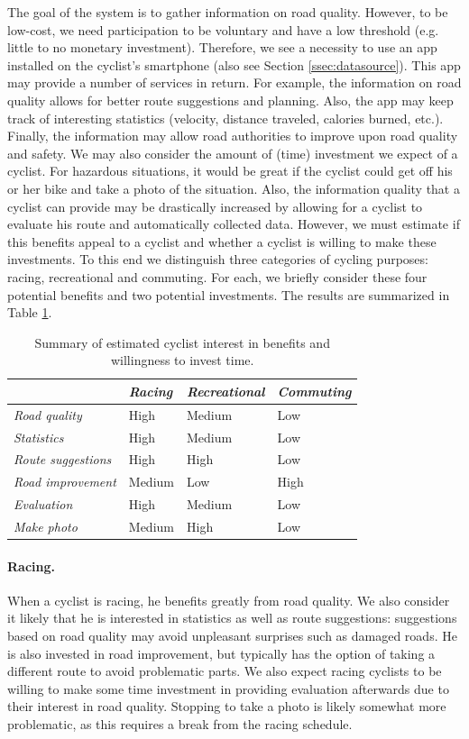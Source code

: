 \documentclass[a4paper,11pt]{article}
\begin{document}
The goal of the system is to gather information on road quality. However, to be low-cost, we need participation to be voluntary and have a low threshold (e.g. little to no monetary investment). Therefore, we see a necessity to use an app installed on the cyclist's smartphone (also see Section \ref{ssec:datasource}). This app may provide a number of services in return. For example, the information on road quality allows for better route suggestions and planning. Also, the app may keep track of interesting statistics (velocity, distance traveled, calories burned, etc.). Finally, the information may allow road authorities to improve upon road quality and safety.
We may also consider the amount of (time) investment we expect of a cyclist. For hazardous situations, it would be great if the cyclist could get off his or her bike and take a photo of the situation. Also, the information quality that a cyclist can provide may be drastically increased by allowing for a cyclist to evaluate his route and automatically collected data.
However, we must estimate if this benefits appeal to a cyclist and whether a cyclist is willing to make these investments. To this end we distinguish three categories of cycling purposes: racing, recreational and commuting. For each, we briefly consider these four potential benefits and two potential investments. The results are summarized in Table \ref{tab:incentives}.

\begin{table}[b]
\centering
\begin{tabular}{l | l l l}
 & \emph{Racing} & \emph{Recreational} & \emph{Commuting}\\
\hline
\emph{Road quality} & High & Medium & Low \\
\emph{Statistics} & High & Medium & Low \\
\emph{Route suggestions} & High & High & Low \\
\emph{Road improvement} & Medium & Low & High \\
\hline
\emph{Evaluation} & High & Medium & Low \\
\emph{Make photo} & Medium & High & Low
\end{tabular}
\caption{Summary of estimated cyclist interest in benefits and willingness to invest time.}
\label{tab:incentives}
\end{table}

\paragraph{Racing.}
When a cyclist is racing, he benefits greatly from road quality. We also consider it likely that he is interested in statistics as well as route suggestions: suggestions based on road quality may avoid unpleasant surprises such as damaged roads. He is also invested in road improvement, but typically has the option of taking a different route to avoid problematic parts. We also expect racing cyclists to be willing to make some time investment in providing evaluation afterwards due to their interest in road quality. Stopping to take a photo is likely somewhat more problematic, as this requires a break from the racing schedule.
\end{document}
